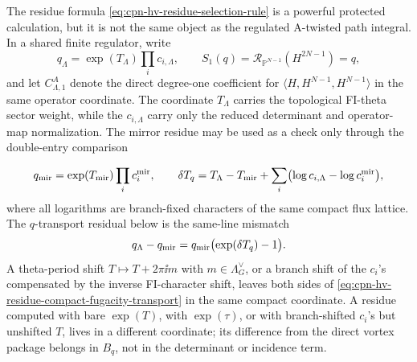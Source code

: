 \begin{remark}
\label{rem:cpn-hv-residue-instanton-cross-check}
The residue formula
\eqref{eq:cpn-hv-residue-selection-rule} is a powerful protected calculation,
but it is not the same object as the regulated A-twisted path integral.  In a
shared finite regulator, write
\[
  q_\Lambda=\exp(T_\Lambda)\prod_i c_{i,\Lambda},
  \qquad
  S_1(q)=\mathcal R_{\mathbb P^{N-1}}(H^{2N-1})=q ,
\]
and let \(C_{\Lambda,1}^{A}\) denote the direct degree-one coefficient for
\(\langle H,H^{N-1},H^{N-1}\rangle\) in the same operator coordinate.  The
coordinate \(T_\Lambda\) carries the topological FI-theta sector weight, while
the \(c_{i,\Lambda}\) carry only the reduced determinant and operator-map
normalization.  The mirror residue may be used as a check only through the
double-entry comparison

\[
  q_{\rm mir}
  =
  \exp(T_{\rm mir})\prod_i c^{\rm mir}_i,
  \qquad
  \delta T_q
  =
  T_\Lambda-T_{\rm mir}
  +
  \sum_i\bigl(\log c_{i,\Lambda}-\log c^{\rm mir}_i\bigr),
\]
where all logarithms are branch-fixed characters of the same compact flux
lattice.  The \(q\)-transport residual below is the same-line mismatch
\begin{equation}
  q_\Lambda-q_{\rm mir}
  =
  q_{\rm mir}\bigl(\exp(\delta T_q)-1\bigr).
  \label{eq:cpn-hv-residue-compact-fugacity-transport}
\end{equation}
A theta-period shift \(T\mapsto T+2\pi\ii m\) with \(m\in\Lambda_G^\vee\), or a
branch shift of the \(c_i\)'s compensated by the inverse FI-character shift,
leaves both sides of
\eqref{eq:cpn-hv-residue-compact-fugacity-transport} in the same compact
coordinate.  A residue computed with bare \(\exp(T)\), with
\(\exp(\tau)\), or with branch-shifted \(c_i\)'s but unshifted \(T\), lives in
a different coordinate; its difference from the direct vortex package belongs
in \(B_q\), not in the determinant or incidence term.


\end{remark}
